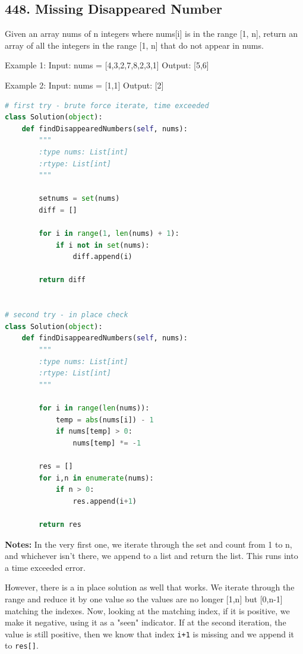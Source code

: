 \documentclass[11pt]{article}
\begin{document}
\subsection*{448. Missing Disappeared Number}
Given an array nums of n integers where nums[i] is in the range [1, n], return an array of all the integers in the range [1, n] that do not appear in nums.

Example 1:
Input: nums = [4,3,2,7,8,2,3,1]
Output: [5,6]

Example 2:
Input: nums = [1,1]
Output: [2]

\begin{lstlisting}[language=python, mathescape=true]
# first try - brute force iterate, time exceeded
class Solution(object):
    def findDisappearedNumbers(self, nums):
        """
        :type nums: List[int]
        :rtype: List[int]
        """

        setnums = set(nums)
        diff = []
        
        for i in range(1, len(nums) + 1):
            if i not in set(nums):
                diff.append(i)
        
        return diff


# second try - in place check
class Solution(object):
    def findDisappearedNumbers(self, nums):
        """
        :type nums: List[int]
        :rtype: List[int]
        """

        for i in range(len(nums)):
            temp = abs(nums[i]) - 1
            if nums[temp] > 0:
                nums[temp] *= -1
            
        res = []
        for i,n in enumerate(nums):
            if n > 0:
                res.append(i+1)
        
        return res
\end{lstlisting}

\noindent \textbf{Notes:} In the very first one, we iterate through the set and count from 1 to n, and whichever isn't there, we append to a list and return the list. This runs into a time exceeded error.

\noindent However, there is a in place solution as well that works. We iterate through the range and reduce it by one value so the values are no longer [1,n] but [0,n-1] matching the indexes. Now, looking at the matching index, if it is positive, we make it negative, using it as a "seen" indicator. If at the second iteration, the value is still positive, then we know that index \texttt{i+1} is missing and we append it to \texttt{res[]}.
\end{document}
